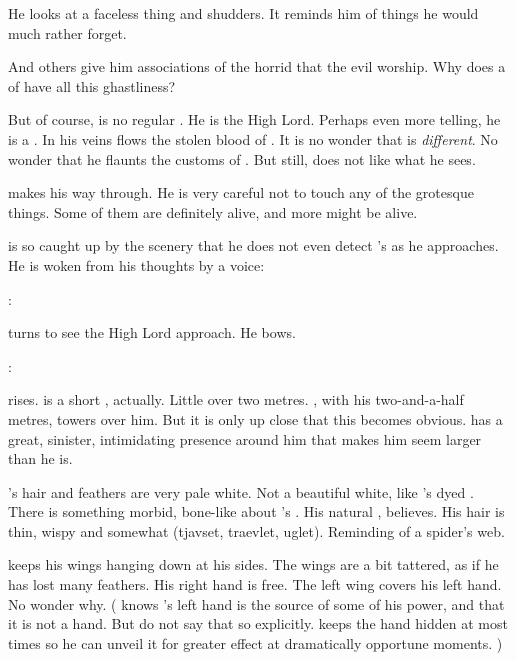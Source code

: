 He looks at a faceless thing and shudders. 
It reminds him of things he would much rather forget. 

And others give him associations of the horrid \xss that the evil \dragons worship. 
Why does a \resphan of \CiriathSepher have all this ghastliness?

But of course, \Azraid is no regular \resphan. 
He is the High Lord. 
Perhaps even more telling, he is a \sathariah. 
In his veins flows the stolen blood of \dragons. 
It is no wonder that \Azraid is \emph{different}.
No wonder that he flaunts the customs of \CiriathSepher. 
But still, \Teshrial does not like what he sees. 

\Teshrial makes his way through.
He is very careful not to touch any of the grotesque things.
Some of them are definitely alive, and more might be alive. 

\Teshrial is so caught up by the scenery that he does not even detect \Azraid's \vertex as he approaches. 
He is woken from his thoughts by a voice:

\Azraid: 

\Teshrial turns to see the High Lord approach.
He bows. 

\Azraid: 

\Teshrial rises. 
\Azraid is a short \resphan, actually. 
Little over two metres. 
\Teshrial, with his two-and-a-half metres, towers over him.
But it is only up close that this becomes obvious. 
\Azraid has a great, sinister, intimidating presence around him that makes him seem larger than he is. 

\Azraid's hair and feathers are very pale white. 
Not a beautiful white, like \Teshrial's dyed \colour. 
There is something morbid, bone-like about \Azraid's \colour. 
His natural \colour, \Teshrial believes. 
His hair is thin, wispy and somewhat (tjavset, traevlet, uglet). 
Reminding of a spider's web. 

\Azraid keeps his wings hanging down at his sides. 
The wings are a bit tattered, as if he has lost many feathers. 
His right hand is free. 
The left wing covers his left hand. 
No wonder why. 
(%
  \Teshrial knows \Azraid's left hand is the source of some of his power, and that it is not a \resphan hand. 
  But do not say that so explicitly. 
  \Azraid keeps the hand hidden at most times so he can unveil it for greater effect at dramatically opportune moments.%
)

